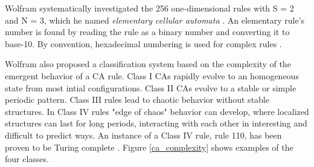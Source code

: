 \documentclass{elsarticle}
\begin{document}
\begin{multicols}{2}
	\par Wolfram systematically 
	investigated the 256 one-dimensional rules with S = 2 and N = 3, which he named 
	\textit{elementary cellular automata} \cite{wolfram2002new}. An elementary rule's number 
	is found by reading the rule as a binary number and converting it to base-10.  
	By convention, hexadecimal numbering is used for complex rules 
	\cite{wuensche1999classifying}.
	
	Wolfram also proposed a classification system based on the complexity of the 
	emergent behavior of a CA rule. Class I CAs rapidly evolve to an homogeneous 
	state from most  intial configurations.  Class II CAs evolve to a stable or 
	simple periodic pattern.  Class III rules lead to chaotic behavior without 
	stable structures.  In Class IV rules "edge of chaos" behavior can develop, 
	where localized structures can last for long periods, interacting with 
	each other in interesting and difficult to predict ways. An instance of 
	a Class IV rule, rule 110, has been proven to be Turing complete 
	\cite{cook2004universality}. Figure \ref{ca_complexity} shows examples 
	of the four classes.  \par
	

\end{multicols}
\end{document}

